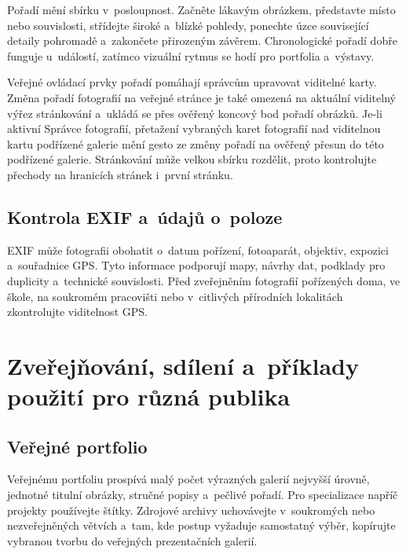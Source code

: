 \documentclass[11pt,a4paper]{article}
\begin{document}
Pořadí mění sbírku v~posloupnost. Začněte lákavým obrázkem, představte místo
nebo souvislosti, střídejte široké a~blízké pohledy, ponechte úzce související
detaily pohromadě a~zakončete přirozeným závěrem. Chronologické pořadí dobře
funguje u~událostí, zatímco vizuální rytmus se hodí pro portfolia a~výstavy.

Veřejné ovládací prvky pořadí pomáhají správcům upravovat viditelné karty. Změna
pořadí fotografií na veřejné stránce je také omezená na aktuální viditelný výřez
stránkování a~ukládá se přes ověřený koncový bod pořadí obrázků. Je-li aktivní
Správce fotografií, přetažení vybraných karet fotografií nad viditelnou kartu
podřízené galerie mění gesto ze změny pořadí na ověřený přesun do této podřízené
galerie. Stránkování může velkou sbírku rozdělit, proto kontrolujte přechody na
hranicích stránek i~první stránku.

\subsection{Kontrola EXIF a~údajů o~poloze}

EXIF může fotografii obohatit o~datum pořízení, fotoaparát, objektiv, expozici
a~souřadnice GPS. Tyto informace podporují mapy, návrhy dat, podklady pro
duplicity a~technické souvislosti. Před zveřejněním fotografií pořízených doma,
ve škole, na soukromém pracovišti nebo v~citlivých přírodních lokalitách
zkontrolujte viditelnost GPS.

\section{Zveřejňování, sdílení a~příklady použití pro různá publika}
\label{sec:audiences}

\subsection{Veřejné portfolio}

Veřejnému portfoliu prospívá malý počet výrazných galerií nejvyšší úrovně,
jednotné titulní obrázky, stručné popisy a~pečlivé pořadí. Pro specializace
napříč projekty používejte štítky. Zdrojové archivy uchovávejte v~soukromých
nebo nezveřejněných větvích a~tam, kde postup vyžaduje samostatný výběr,
kopírujte vybranou tvorbu do veřejných prezentačních galerií.
\end{document}
